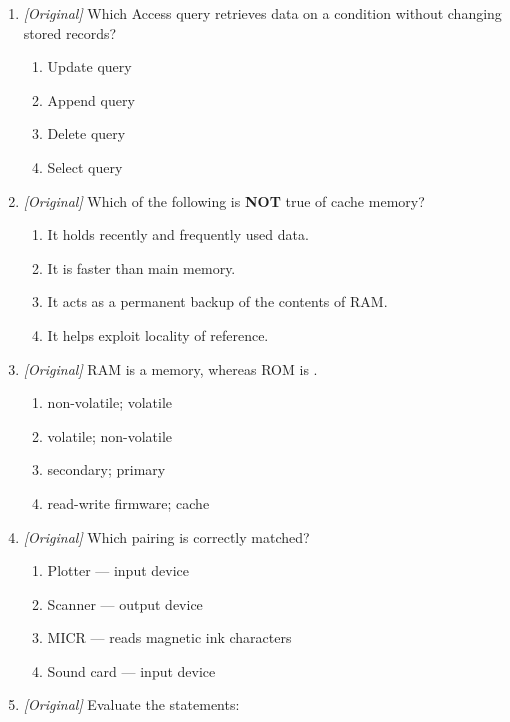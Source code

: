 \documentclass[11pt]{article}
\begin{document}
\begin{enumerate}[label=\textbf{Q\arabic*.}, leftmargin=*]
\begin{enumerate}[label=\Alph*.]
  \end{enumerate}
\item \textit{[Original]} Which Access query retrieves data on a condition
  without changing stored records?
  \begin{enumerate}[label=\Alph*.]
    \item Update query
    \item Append query
    \item Delete query
    \item Select query
  \end{enumerate}
\item \textit{[Original]} Which of the following is \textbf{NOT} true of
  cache memory?
  \begin{enumerate}[label=\Alph*.]
    \item It holds recently and frequently used data.
    \item It is faster than main memory.
    \item It acts as a permanent backup of the contents of RAM.
    \item It helps exploit locality of reference.
  \end{enumerate}
\item \textit{[Original]} RAM is a \underline{\hspace{2.2cm}} memory, whereas
  ROM is \underline{\hspace{2.2cm}}.
  \begin{enumerate}[label=\Alph*.]
    \item non-volatile; volatile
    \item volatile; non-volatile
    \item secondary; primary
    \item read-write firmware; cache
  \end{enumerate}
\item \textit{[Original]} Which pairing is correctly matched?
  \begin{enumerate}[label=\Alph*.]
    \item Plotter --- input device
    \item Scanner --- output device
    \item MICR --- reads magnetic ink characters
    \item Sound card --- input device
  \end{enumerate}
\item \textit{[Original]} Evaluate the statements:
  \begin{enumerate}[label=\Roman*.]

\end{enumerate}
\end{enumerate}
\end{document}
